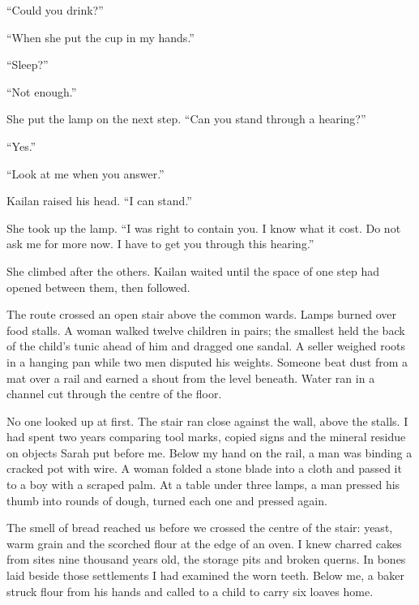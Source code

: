 ``Could you drink?''\par

``When she put the cup in my hands.''\par

``Sleep?''\par

``Not enough.''\par

She put the lamp on the next step. ``Can you stand through a hearing?''\par

``Yes.''\par

``Look at me when you answer.''\par

Kailan raised his head. ``I can stand.''\par

She took up the lamp. ``I was right to contain you. I know what it cost. Do not ask me for more now. I have to get you through this hearing.''\par

She climbed after the others. Kailan waited until the space of one step had opened between them, then followed.\par

\ornament

The route crossed an open stair above the common wards. Lamps burned over food stalls. A woman walked twelve children in pairs; the smallest held the back of the child's tunic ahead of him and dragged one sandal. A seller weighed roots in a hanging pan while two men disputed his weights. Someone beat dust from a mat over a rail and earned a shout from the level beneath. Water ran in a channel cut through the centre of the floor.\par

No one looked up at first. The stair ran close against the wall, above the stalls. I had spent two years comparing tool marks, copied signs and the mineral residue on objects Sarah put before me. Below my hand on the rail, a man was binding a cracked pot with wire. A woman folded a stone blade into a cloth and passed it to a boy with a scraped palm. At a table under three lamps, a man pressed his thumb into rounds of dough, turned each one and pressed again.\par

The smell of bread reached us before we crossed the centre of the stair: yeast, warm grain and the scorched flour at the edge of an oven. I knew charred cakes from sites nine thousand years old, the storage pits and broken querns. In bones laid beside those settlements I had examined the worn teeth. Below me, a baker struck flour from his hands and called to a child to carry six loaves home.\par

